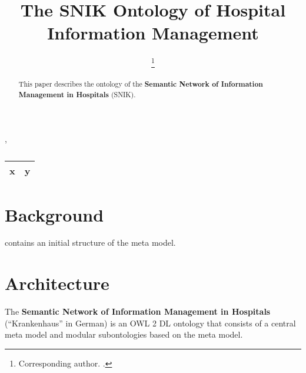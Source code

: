 \documentclass[sw]{iosart2x}
\begin{document}
\begin{frontmatter}

\title{The SNIK Ontology of Hospital Information Management}

\author[A]{ %
\thanks{Corresponding author. .}},
\author[A]{ }
\author[A]{ }
\author[A]{ }
\author[A]{ }
\author[A]{ }
\runningauthor{}
\address[A]{Institute for Medical Informatics, Statistics and Epidemiology (IMISE),
, }

\begin{abstract}
This paper describes the ontology of the \textbf{Semantic Network of Information Management in Hospitals} (SNIK).  
\end{abstract}

\begin{keyword}
\end{keyword}

\end{frontmatter}

\begin{table}
\caption{}
\label{tab:namespaces}
\begin{tabular}{ll}
\toprule
\textbf{x}	&\textbf{y}\\
\midrule
\bottomrule
\end{tabular}
\end{table}

\section{Background}\label{sec:background}
\citet{domaene} contains an initial structure of the meta model.

\section{Architecture}\label{sec:architecture}
The \textbf{Semantic Network of Information Management in Hospitals} (\enquote{Krankenhaus} in German) is an OWL 2 DL ontology that consists of a central meta model and modular subontologies based on the meta model. 
\end{document}
